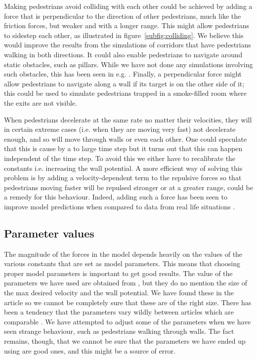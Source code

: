 Making pedestrians avoid colliding with each other could be achieved by adding 
a force that is perpendicular to the direction of other pedestrians, much like 
the friction forces, but weaker and with a longer range. This might allow 
pedestrians to sidestep each other, as illustrated in 
figure~\ref{subfig:colliding}. We believe this would improve the results from 
the simulations of corridors that have pedestrians walking in both directions.  
It could also enable pedestrians to navigate around static obstacles, such as 
pillars. While we have not done any simulations involving such obstacles, this 
has been seen in e.g. \cite{tang}. Finally, a perpendicular force might allow 
pedestrians to navigate along a wall if its target is on the other side of it; 
this could be used to simulate pedestrians trapped in a smoke-filled room 
where the exits are not visible.

When pedestrians decelerate at the same rate no matter their velocities, they 
will in certain extreme cases (i.e. when they are moving very fast) not 
decelerate enough, and so will move through walls or even each other. One could speculate that this is cause by a to large time step but it turns out that this can happen independent of the time step. To avoid this we either have to recalibrate the constants i.e. increasing the wall potential. A more efficient way of solving this problem is by adding a velocity-dependent term to the repulsive forces so 
that pedestrians moving faster will be repulsed stronger or at a greater 
range, could be a remedy for this behaviour. Indeed, adding such a force has 
been seen to improve model predictions when compared to data from real life 
situations \cite{ABconstant}.

\subsection{Parameter values}
The magnitude of the forces in the model depends heavily on the values of the 
various constants that are set as model parameters. This means that choosing 
proper model parameters is important to get good results.
The value of the parameters we have 
used are obtained from \cite{self-org}, but they do no mention the size of the
max desired velocity and the wall potential. We have found these in the article \cite{social-force} so we cannot be completely sure that these are of the right size.
There has been a tendency that the parameters vary wildly between articles which are comparable \cite{frebyheat} \cite{} \cite{}. We have 
attempted to adjust some of the parameters when we have seen strange 
behaviour, such as pedestrians walking through walls. The fact remains, 
though, that we cannot be sure that the parameters we have ended up using are 
good ones, and this might be a source of error.

